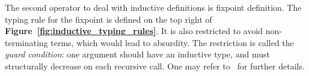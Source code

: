 \documentclass[a4paper,USenglish]{lipics}
\DeclareMathOperator{\Prop}{\mathtt{Prop}}
\DeclareMathOperator{\Type}{\mathtt{Type}}
\DeclareMathOperator{\Eq}{\mathtt{eq}}
\def\cic{\textsf{CIC}\xspace}
\newcommand{\arrlong}[1]{\overrightarrow{#1}}
\newcommand\arn[2]{
{\arrlong{#1}}^{#2}
}
\begin{document}
\begin{comment}
Strong elimination from $\Prop$ to $\Type$ is widely used in \cic. For
instance, as
it allows to destruct the equality $\Eq_i$ to build informative types,
it is possible to build elements of $\Type$ in the absurd context where
$0 = S\,0$. Strong elimination is also used in \cic to define fixpoints
by destructing the accessibility condition of a well-founded relation.
\end{comment}
\begin{comment}
For coherence reasons, eliminations from $\Prop$ to higher sorts are
restricted. This is the restriction (1), which states that the inductive definition
should have
at most one constructor and that all the arguments (which are not parameters)
of this constructor should be of sort $\Prop$:
\begin{equation}\label{eq:restr1}
 \begin{array}{c}
  k = 0 \text{ or } \left(k = 1 \text{ and } \vdash E : \Prop \text{ for
    any } E ∈ \arn{E_1}{n_1}\right)
 \end{array}
\end{equation}
This restriction is essential: if these eliminations were unrestrained,
not only the extraction would be unable to erase proofs but also the system
would be inconsistent~\cite{DBLP:conf/lics/Coquand86}.

From the computational point of view, it is natural that computing an
informative type should not rely on any proof structure, that would
disappear during program extraction. Allowing large elimination under
restriction~(\ref{eq:restr1}) has a computational meaning: informally,
since there is at most one branch, we know the structure of the proof,
and since this branch depends only on proofs, they are erased, so it is
not a problem if the whole branch is erased (one can refer
to~\cite{DBLP:conf/types/Letouzey02,letouzey04} for formal details).

To sum up: when building a program, inspecting a proof or a program has a
correct computational behavior. Moreover we cannot inspect an arity, since
inductive definitions cannot be of sort $\Type$.
\end{comment}

The second operator to deal with inductive definitions is fixpoint definition. The typing
rule for the fixpoint is defined on the top right of
\textsf{\textbf{\small Figure~\ref{fig:inductive_typing_rules}}}. It is also restricted to avoid
non-terminating terms, which would lead to absurdity. The restriction is
called the \emph{guard condition}: one argument should have an inductive
type, and must structurally decrease on each recursive call. One may
refer to~\cite{Gimenez95} for further details.
\end{document}
